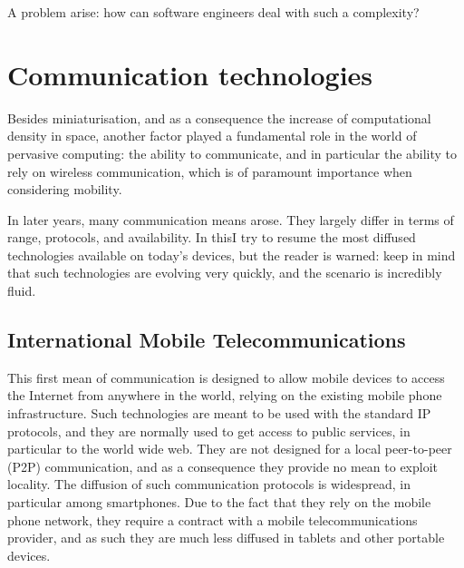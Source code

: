 \documentclass[12pt,a4paper,twoside,openright]{book}
\begin{document}
A problem arise: how can software engineers deal with such a complexity?

\section{Communication technologies}

Besides miniaturisation, and as a consequence the increase of computational density in space, another factor played a fundamental role in the world of pervasive computing: the ability to communicate, and in particular the ability to rely on wireless communication, which is of paramount importance when considering mobility.

In later years, many communication means arose.
%
They largely differ in terms of range, protocols, and availability.
%
In this\levelText{}I try to resume the most diffused technologies available on today's devices, but the reader is warned: keep in mind that such technologies are evolving very quickly, and the scenario is incredibly fluid.

\subsection{International Mobile Telecommunications}
\label{International Mobile Telecommunications}

This first mean of communication is designed to allow mobile devices to access the Internet from anywhere in the world, relying on the existing mobile phone infrastructure.
%
Such technologies are meant to be used with the standard IP protocols, and they are normally used to get access to public services, in particular to the world wide web.
%
They are not designed for a local peer-to-peer (P2P) communication, and as a consequence they provide no mean to exploit locality.
%
The diffusion of such communication protocols is widespread, in particular among smartphones.
%
Due to the fact that they rely on the mobile phone network, they require a contract with a mobile telecommunications provider, and as such they are much less diffused in tablets and other portable devices.
\end{document}
